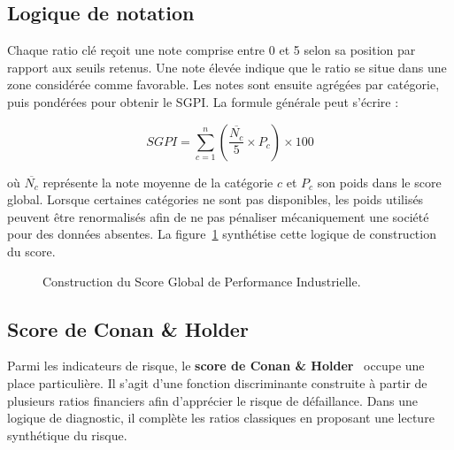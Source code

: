 \subsection{Logique de notation}
\par Chaque ratio clé reçoit une note comprise entre 0 et 5 selon sa position
par rapport aux seuils retenus. Une note élevée indique que le ratio se situe
dans une zone considérée comme favorable. Les notes sont ensuite agrégées par
catégorie, puis pondérées pour obtenir le \ac{SGPI}. La formule générale peut
s'écrire :

\begin{equation}
SGPI = \sum_{c=1}^{n} \left(\frac{\overline{N_c}}{5} \times P_c\right) \times 100
\end{equation}

\par où $\overline{N_c}$ représente la note moyenne de la catégorie $c$ et
$P_c$ son poids dans le score global. Lorsque certaines catégories ne sont pas
disponibles, les poids utilisés peuvent être renormalisés afin de ne pas
pénaliser mécaniquement une société pour des données absentes. La
figure~\ref{fig:sgpiflow} synthétise cette logique de construction du score.

\begin{figure}[H]
\centering
{}
\caption[Construction du SGPI]{Construction du Score Global de Performance Industrielle.}
\label{fig:sgpiflow}
\end{figure}

\subsection{Score de Conan \& Holder}
\par Parmi les indicateurs de risque, le \textbf{score de Conan \&
Holder}~\cite{conan1979} occupe une place particulière. Il s'agit d'une fonction
discriminante construite à partir de plusieurs ratios financiers afin d'apprécier
le risque de défaillance. Dans une logique de diagnostic, il complète les ratios
classiques en proposant une lecture synthétique du risque.

